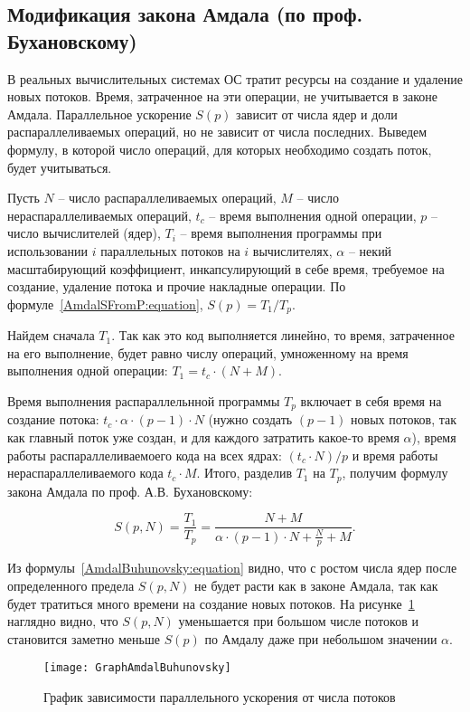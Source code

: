 \subsection{Модификация закона Амдала (по проф. Бухановскому)}

В реальных вычислительных системах ОС тратит ресурсы на создание и удаление новых потоков. Время, затраченное на эти операции, не учитывается в законе Амдала. Параллельное ускорение $S(p)$ зависит от числа ядер и доли распараллеливаемых операций, но не зависит от числа последних. Выведем формулу, в которой число операций, для которых необходимо создать поток, будет учитываться.

Пусть $N$ -- число распараллеливаемых операций, $M$ -- число нераспараллеливаемых операций, $t_c$ -- время выполнения одной операции, $p$ -- число вычислителей (ядер), $T_i$ -- время выполнения программы при использовании $i$ параллельных потоков на $i$ вычислителях, $\alpha$ -- некий масштабирующий коэффициент, инкапсулирующий в себе время, требуемое на создание, удаление потока и прочие накладные операции. 
По формуле~\eqref{AmdalSFromP:equation}, $S(p) = {T_1} / {T_p}$.

Найдем сначала $T_1$. Так как это код выполняется линейно, то время, затраченное на его выполнение, будет равно числу операций, умноженному на время выполнения одной операции: $T_1 = t_c \cdot (N + M)$.

Время выполнения распараллельнной программы $T_p$ включает в себя время на создание потока: $t_c \cdot \alpha \cdot (p - 1) \cdot N$ (нужно создать $(p - 1)$ новых потоков, так как главный поток уже создан, и для каждого затратить какое-то время $\alpha$), время работы распараллеливаемоего кода на всех ядрах: $(t_c \cdot N) / {p}$ и время работы нераспараллеливаемого кода $t_c \cdot M$. Итого, разделив $T_1$ на $T_p$, получим формулу закона Амдала по проф. А.В. Бухановскому:

\begin{equation}
    \label{AmdalBuhunovsky:equation}
    S(p,N) = \frac{T_1}{T_p} = \frac{N + M}{\alpha \cdot (p - 1) \cdot N + \displaystyle\frac{N}{p} + M}.
\end{equation}

Из формулы~\eqref{AmdalBuhunovsky:equation} видно, что с ростом числа ядер после определенного предела $S(p,N)$  не будет расти как в законе Амдала, так как будет тратиться много времени на создание новых потоков. На рисунке~\ref{GraphAmdalBuhunovsky:image} наглядно видно, что $S(p,N)$ уменьшается при большом числе потоков и становится заметно меньше $S(p)$ по Амдалу даже при небольшом значении $\alpha$.

\begin{figure}[H]
    \texttt{[image: GraphAmdalBuhunovsky]}
    \caption{График зависимости параллельного ускорения от числа потоков}
    \label{GraphAmdalBuhunovsky:image}
\end{figure}

